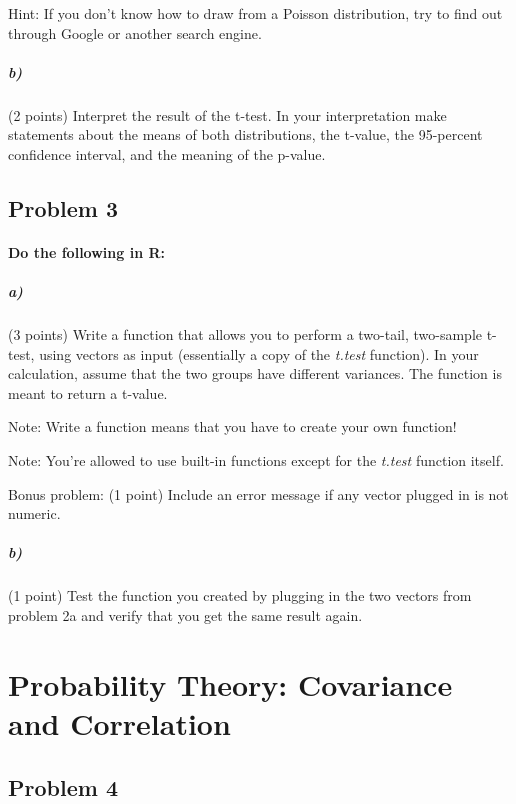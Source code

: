 \documentclass[12pt,letter]{article}
\begin{document}
\bigskip

Hint: If you don't know how to draw from a Poisson distribution, try to find out through Google or another search engine.

\subparagraph{b)} (2 points) Interpret the result of the t-test. In your interpretation make statements about the means of both distributions, the t-value, the 95-percent confidence interval, and the meaning of the p-value.



\subsection*{Problem 3}

\paragraph{Do the following in R:}

\subparagraph{a)} (3 points) Write a function that allows you to perform a two-tail, two-sample t-test, using vectors as input (essentially a copy of the \textit{t.test} function). In your calculation, assume that the two groups have different variances. The function is meant to return a t-value.

\bigskip

Note: Write a function means that you have to create your own function!

\bigskip

Note: You're allowed to use built-in functions except for the \textit{t.test} function itself.

\bigskip

Bonus problem: (1 point) Include an error message if any vector plugged in is not numeric.

\subparagraph{b)} (1 point) Test the function you created by plugging in the two vectors from problem 2a and verify that you get the same result again.





\section*{Probability Theory: Covariance and Correlation}

\subsection*{Problem 4}
\end{document}
